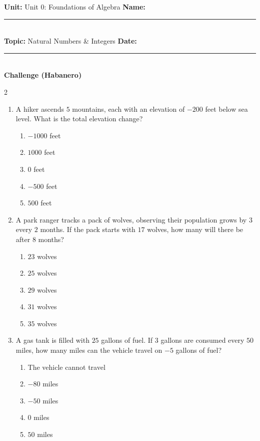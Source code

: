 \documentclass[10pt]{article}
\begin{document}
\enlargethispage{2.5cm}

\begin{tcolorbox}[colback=mainblue!5, colframe=mainblue, sharp corners, boxrule=0.5pt]
    \small \textbf{Unit:} Unit 0: Foundations of Algebra \hfill \textbf{Name:} \rule{3cm}{0.4pt} \\
    \small \textbf{Topic:} Natural Numbers & Integers \hfill \textbf{Date:} \rule{2cm}{0.4pt} \\
    \centering \textbf{\large Challenge (Habanero)}
\end{tcolorbox}

\vspace{0.2cm}

\begin{multicols}{2}
\begin{enumerate}[label=\textbf{Q\arabic*.}, leftmargin=*, itemsep=6pt, parsep=0pt]

  \item \small A hiker ascends $5$ mountains, each with an elevation of $-200$ feet below sea level. What is the total elevation change?
  \begin{enumerate}[label=(\Alph*), leftmargin=0.6cm, nosep, itemsep=2pt]
    \item $-1000$ feet
    \item $1000$ feet
    \item $0$ feet
    \item $-500$ feet
    \item $500$ feet
  \end{enumerate}

  \item \small A park ranger tracks a pack of wolves, observing their population grows by $3$ every $2$ months. If the pack starts with $17$ wolves, how many will there be after $8$ months?
  \begin{enumerate}[label=(\Alph*), leftmargin=0.6cm, nosep, itemsep=2pt]
    \item $23$ wolves
    \item $25$ wolves
    \item $29$ wolves
    \item $31$ wolves
    \item $35$ wolves
  \end{enumerate}

  \item \small A gas tank is filled with $25$ gallons of fuel. If $3$ gallons are consumed every $50$ miles, how many miles can the vehicle travel on $-5$ gallons of fuel?
  \begin{enumerate}[label=(\Alph*), leftmargin=0.6cm, nosep, itemsep=2pt]
    \item The vehicle cannot travel
    \item $-80$ miles
    \item $-50$ miles
    \item $0$ miles
    \item $50$ miles
  \end{enumerate}


\end{enumerate}
\end{multicols}
\end{document}

